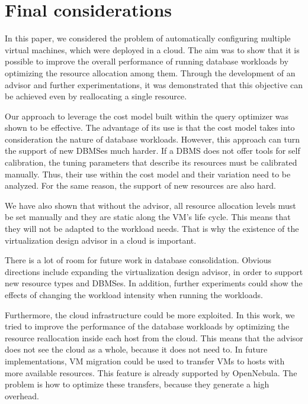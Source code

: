 \chapter{\textbf{Final considerations}}

In this paper, we considered the problem of automatically configuring multiple virtual machines, which were deployed in a cloud. The aim was to show that it is possible to improve the overall performance of running database workloads by optimizing the resource allocation among them. Through the development of an advisor and further experimentations, it was demonstrated that this objective can be achieved even by reallocating a single resource.

Our approach to leverage the cost model built within the query optimizer was shown to be effective. The advantage of its use is that the cost model takes into consideration the nature of database workloads. However, this approach can turn the support of new DBMSes much harder. If a DBMS does not offer tools for self calibration, the tuning parameters that describe its resources must be calibrated manually. Thus, their use within the cost model and their variation need to be analyzed. For the same reason, the support of new resources are also hard.

We have also shown that without the advisor, all resource allocation levels must be set manually and they are static along the VM's life cycle. This means that they will not be adapted to the workload needs. That is why the existence of the virtualization design advisor in a cloud is important.

There is a lot of room for future work in database consolidation. Obvious directions include expanding the virtualization design advisor, in order to support new resource types and DBMSes. In addition, further experiments could show the effects of changing the workload intensity when running the workloads.

Furthermore, the cloud infrastructure could be more exploited. In this work, we tried to improve the performance of the database workloads by optimizing the resource reallocation inside each host from the cloud. This means that the advisor does not see the cloud as a whole, because it does not need to. In future implementations, VM migration could be used to transfer VMs to hosts with more available resources.  This feature is already supported by OpenNebula. The problem is how to optimize these transfers, because they generate a high overhead. 

